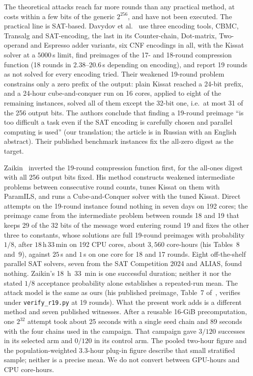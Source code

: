\documentclass[11pt,a4paper]{article}
\begin{document}
The theoretical attacks reach far more rounds than any practical method,
at costs within a few bits of the generic $2^{256}$, and have not been
executed.  The practical line is SAT-based.  Davydov et
al.~\cite{Davydov2025} use three encoding tools, CBMC, Transalg and SAT-encoding, the last in its Counter-chain, Dot-matrix, Two-operand and Espresso adder variants, six CNF encodings in all, with the Kissat solver at a $5000$\,s limit, find preimages of
the 17- and 18-round compression function (18 rounds in $2.38$--$20.6$\,s
depending on encoding), and report 19 rounds as not solved for every
encoding tried.  Their weakened 19-round problem constrains only a zero
prefix of the output: plain Kissat reached a 24-bit prefix, and a 24-hour cube-and-conquer run on 16 cores, applied to eight of the remaining instances, solved all of them except the 32-bit one, i.e.\ at most 31 of the 256 output bits.  The authors conclude that finding a 19-round preimage ``is too difficult a task even if the SAT encoding is carefully chosen and parallel computing is used'' (our translation; the article is in Russian with an English abstract).  Their published benchmark
instances fix the all-zero digest as the target.

Zaikin~\cite{Zaikin2026} inverted the 19-round compression function first,
for the all-ones digest with all 256 output bits fixed.  His method
constructs weakened intermediate problems between consecutive round counts,
tunes Kissat on them with ParamILS, and runs a Cube-and-Conquer solver with
the tuned Kissat.  Direct attempts on the 19-round instance found nothing
in seven days on 192 cores; the preimage came from the intermediate problem between rounds 18 and 19 that keeps 29 of the 32 bits of the message word entering round 19 and fixes the other three to constants, whose solutions are full 19-round preimages with probability $1/8$,
after $18$\,h\,$33$\,min on 192 CPU cores, about $3{,}560$ core-hours (his
Tables~8 and~9), against $25$\,s and $1$\,s on one core for 18 and 17
rounds.  Eight off-the-shelf parallel SAT solvers, seven from the SAT
Competition 2024 and ALIAS, found nothing.  Zaikin's 18~h~33~min is one
successful duration; neither it nor the stated $1/8$ acceptance probability
alone establishes a repeated-run mean.  The attack model is the same as ours
(his published preimage, Table~7 of~\cite{Zaikin2026}, verifies under
\texttt{verify\_r19.py} at 19 rounds).  What the present work adds is a
different method and seven published witnesses.  After a reusable 16-GiB
precomputation, one $2^{32}$ attempt took about 25 seconds with a single seed
chain and 89 seconds with the four chains used in the campaign.  That campaign
gave $3/120$ successes in its selected arm and $0/120$ in its control arm.
The pooled two-hour figure and the population-weighted 3.3-hour plug-in figure
describe that small stratified sample; neither is a precise mean.  We do not
convert between GPU-hours and CPU core-hours.
\end{document}
